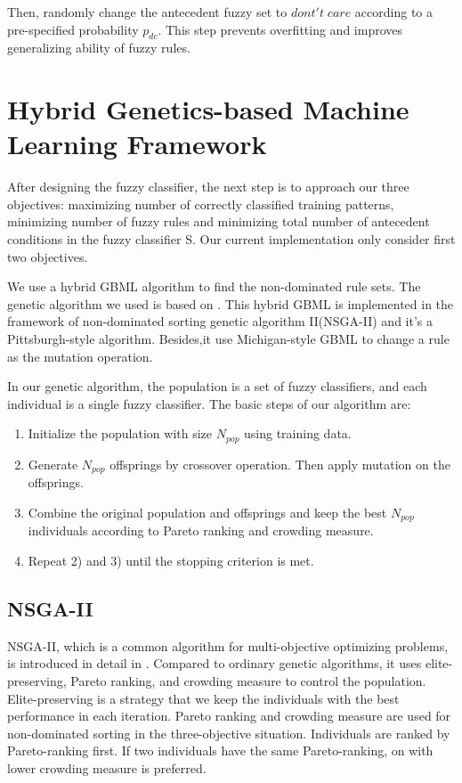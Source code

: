 \documentclass[conference]{IEEEtran}
\begin{document}
  Then, randomly change the antecedent fuzzy set to $dont't\;care$ according to a pre-specified probability $p_{dc}$. This step prevents overfitting and improves generalizing ability of fuzzy rules.
  \section{Hybrid Genetics-based Machine Learning Framework}
  After designing the fuzzy classifier, the next step is to approach our three objectives: maximizing number of correctly classified training patterns, minimizing number of fuzzy rules and minimizing total number of antecedent conditions in the fuzzy classifier S. Our current implementation only consider first two objectives.
	 
	 We use a hybrid GBML algorithm to find the non-dominated rule sets. The genetic algorithm we used is based on \cite{ishibuchi2007analysis}. This hybrid GBML is implemented in the framework of non-dominated sorting genetic algorithm II(NSGA-II) and it's a Pittsburgh-style algorithm. Besides,it use Michigan-style GBML to change a rule as the mutation operation. 
	 
  In our genetic algorithm, the population is a set of fuzzy classifiers, and each individual is a single fuzzy classifier. The basic steps of our algorithm are:
  \begin{enumerate}
  \item Initialize the population with size $N_{pop}$ using training data.
  \item Generate $N_{pop}$ offsprings by crossover operation. Then apply mutation on the offsprings.
  \item Combine the original population and offsprings and keep the best $N_{pop}$ individuals according to Pareto ranking and crowding measure.
  \item Repeat 2) and 3) until the stopping criterion is met.
  \end{enumerate}
  
	 
	 \subsection{NSGA-II}
	 
   NSGA-II, which is a common algorithm for multi-objective optimizing problems, is introduced in detail in \cite{996017}. Compared to ordinary genetic algorithms, it uses elite-preserving, Pareto ranking, and crowding measure to control the population. Elite-preserving is a strategy that we keep the individuals with the best performance in each iteration. Pareto ranking and crowding measure are used for non-dominated sorting in the three-objective situation. Individuals are ranked by Pareto-ranking first. If two individuals have the same Pareto-ranking, on with lower crowding measure is preferred.
   
\end{document}
